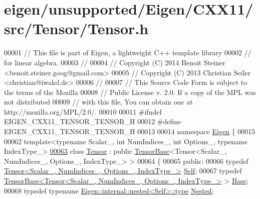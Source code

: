 \hypertarget{eigen_2unsupported_2_eigen_2_c_x_x11_2src_2_tensor_2_tensor_8h_source}{}\section{eigen/unsupported/\+Eigen/\+C\+X\+X11/src/\+Tensor/\+Tensor.h}
\label{eigen_2unsupported_2_eigen_2_c_x_x11_2src_2_tensor_2_tensor_8h_source}

\begin{DoxyCode}
00001 \textcolor{comment}{// This file is part of Eigen, a lightweight C++ template library}
00002 \textcolor{comment}{// for linear algebra.}
00003 \textcolor{comment}{//}
00004 \textcolor{comment}{// Copyright (C) 2014 Benoit Steiner <benoit.steiner.goog@gmail.com>}
00005 \textcolor{comment}{// Copyright (C) 2013 Christian Seiler <christian@iwakd.de>}
00006 \textcolor{comment}{//}
00007 \textcolor{comment}{// This Source Code Form is subject to the terms of the Mozilla}
00008 \textcolor{comment}{// Public License v. 2.0. If a copy of the MPL was not distributed}
00009 \textcolor{comment}{// with this file, You can obtain one at http://mozilla.org/MPL/2.0/.}
00010 
00011 \textcolor{preprocessor}{#ifndef EIGEN\_CXX11\_TENSOR\_TENSOR\_H}
00012 \textcolor{preprocessor}{#define EIGEN\_CXX11\_TENSOR\_TENSOR\_H}
00013 
00014 \textcolor{keyword}{namespace }\hyperlink{namespace_eigen}{Eigen} \{
00015 
00062 \textcolor{keyword}{template}<\textcolor{keyword}{typename} Scalar\_, \textcolor{keywordtype}{int} NumIndices\_, \textcolor{keywordtype}{int} Options\_, \textcolor{keyword}{typename} IndexType\_>
\hyperlink{class_eigen_1_1_tensor}{00063} \textcolor{keyword}{class }\hyperlink{class_eigen_1_1_tensor}{Tensor} : \textcolor{keyword}{public} \hyperlink{class_eigen_1_1_tensor_base}{TensorBase}<Tensor<Scalar\_, NumIndices\_, Options\_, IndexType\_> >
00064 \{
00065   \textcolor{keyword}{public}:
00066     \textcolor{keyword}{typedef} \hyperlink{class_eigen_1_1_tensor}{Tensor<Scalar\_, NumIndices\_, Options\_, IndexType\_>}
       \hyperlink{class_eigen_1_1_tensor}{Self};
00067     \textcolor{keyword}{typedef} \hyperlink{class_eigen_1_1_tensor_base}{TensorBase<Tensor<Scalar\_, NumIndices\_, Options\_, IndexType\_>}
       > \hyperlink{class_eigen_1_1_tensor_base}{Base};
00068     \textcolor{keyword}{typedef} \textcolor{keyword}{typename} \hyperlink{class_eigen_1_1internal_1_1_tensor_lazy_evaluator_writable}{Eigen::internal::nested<Self>::type} 
      \hyperlink{class_eigen_1_1internal_1_1_tensor_lazy_evaluator_writable}{Nested};

\end{DoxyCode}
